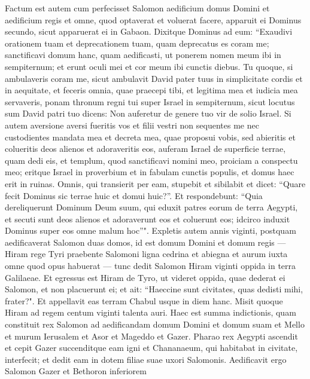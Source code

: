 \begin{biblechapter}  
\verse Factum est autem cum perfecisset Salomon aedificium domus Domini et aedificium regis et omne, quod optaverat et voluerat facere, 
\verse apparuit ei Dominus secundo, sicut apparuerat ei in Gabaon. 
\verse Dixitque Dominus ad eum: “Exaudivi orationem tuam et deprecationem tuam, quam deprecatus es coram me; sanctificavi domum hanc, quam aedificasti, ut ponerem nomen meum ibi in sempiternum; et erunt oculi mei et cor meum ibi cunctis diebus. 
\verse Tu quoque, si ambulaveris coram me, sicut ambulavit David pater tuus in simplicitate cordis et in aequitate, et feceris omnia, quae praecepi tibi, et legitima mea et iudicia mea servaveris, 
\verse ponam thronum regni tui super Israel in sempiternum, sicut locutus sum David patri tuo dicens: Non auferetur de genere tuo vir de solio Israel. 
\verse Si autem aversione aversi fueritis vos et filii vestri non sequentes me nec custodientes mandata mea et decreta mea, quae proposui vobis, sed abieritis et colueritis deos alienos et adoraveritis eos,  
\verse auferam Israel de superficie terrae, quam dedi eis, et templum, quod sanctificavi nomini meo, proiciam a conspectu meo; eritque Israel in proverbium et in fabulam cunctis populis, 
\verse et domus haec erit in ruinas. Omnis, qui transierit per eam, stupebit et sibilabit et dicet: “Quare fecit Dominus sic terrae huic et domui huic?”. 
\verse Et respondebunt: “Quia dereliquerunt Dominum Deum suum, qui eduxit patres eorum de terra Aegypti, et secuti sunt deos alienos et adoraverunt eos et coluerunt eos; idcirco induxit Dominus super eos omne malum hoc”". 
\verse Expletis autem annis viginti, postquam aedificaverat Salomon duas domos, id est domum Domini et domum regis 
\verse — Hiram rege Tyri praebente Salomoni ligna cedrina et abiegna et aurum iuxta omne quod opus habuerat — tunc dedit Salomon Hiram viginti oppida in terra Galilaeae. 
\verse Et egressus est Hiram de Tyro, ut videret oppida, quae dederat ei Salomon, et non placuerunt ei; 
\verse et ait: “Haeccine sunt civitates, quas dedisti mihi, frater?". Et appellavit eas terram Chabul usque in diem hanc. 
\verse Misit quoque Hiram ad regem centum viginti talenta auri. 
\verse Haec est summa indictionis, quam constituit rex Salomon ad aedificandam domum Domini et domum suam et Mello et murum Ierusalem et Asor et Mageddo et Gazer.  
\verse Pharao rex Aegypti ascendit et cepit Gazer succenditque eam igni et Chananaeum, qui habitabat in civitate, interfecit; et dedit eam in dotem filiae suae uxori Salomonis. 
\verse Aedificavit ergo Salomon Gazer et Bethoron inferiorem 

\end{biblechapter}
